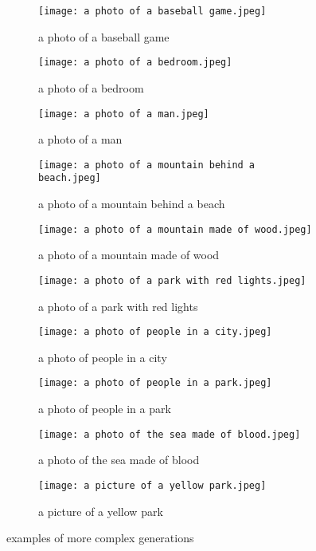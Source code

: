 \documentclass{article}
\begin{document}
\begin{appendix}
\begin{figure}[H]
\begin{subfigure}{.5\textwidth}
  \centering
  \texttt{[image: a photo of a baseball game.jpeg]}
  \caption{a photo of a baseball game}
  \label{fig:a photo of a baseball game}
\end{subfigure}%
\begin{subfigure}{.5\textwidth}
  \centering
  \texttt{[image: a photo of a bedroom.jpeg]}
  \caption{a photo of a bedroom}
  \label{fig:a photo of a bedroom}
\end{subfigure}
\begin{subfigure}{.5\textwidth}
  \centering
  \texttt{[image: a photo of a man.jpeg]}
  \caption{a photo of a man}
  \label{fig:a photo of a man}
\end{subfigure}
\begin{subfigure}{.5\textwidth}
  \centering
  \texttt{[image: a photo of a mountain behind a beach.jpeg]}
  \caption{a photo of a mountain behind a beach}
  \label{fig:a photo of a mountain behind a beach}
\end{subfigure}
\begin{subfigure}{.5\textwidth}
  \centering
  \texttt{[image: a photo of a mountain made of wood.jpeg]}
  \caption{a photo of a mountain made of wood}
  \label{fig:a photo of a mountain made of wood}
\end{subfigure}
\begin{subfigure}{.5\textwidth}
  \centering
  \texttt{[image: a photo of a park with red lights.jpeg]}
  \caption{a photo of a park with red lights}
  \label{fig:a photo of a park with red lights}
\end{subfigure}
\begin{subfigure}{.5\textwidth}
  \centering
  \texttt{[image: a photo of people in a city.jpeg]}
  \caption{a photo of people in a city}
  \label{fig:a photo of people in a city}
\end{subfigure}
\begin{subfigure}{.5\textwidth}
  \centering
  \texttt{[image: a photo of people in a park.jpeg]}
  \caption{a photo of people in a park}
  \label{fig:a photo of people in a park}
\end{subfigure}
\begin{subfigure}{.5\textwidth}
  \centering
  \texttt{[image: a photo of the sea made of blood.jpeg]}
  \caption{a photo of the sea made of blood}
  \label{fig:a photo of the sea made of blood}
\end{subfigure}
\begin{subfigure}{.5\textwidth}
  \centering
  \texttt{[image: a picture of a yellow park.jpeg]}
  \caption{a picture of a yellow park}
  \label{fig:a picture of a yellow park}
\end{subfigure}
\caption{examples of more complex generations}
\label{fig:complex_generations}
\end{figure}


\end{appendix}
\end{document}

